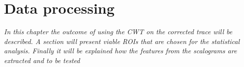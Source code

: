 \chapter{Data processing}
\textit{In this chapter the outcome of using the CWT on the corrected trace will be described. A section will present viable ROIs that are chosen for the statistical analysis. Finally it will be explained how the features from the scalograms are extracted and to be tested } 